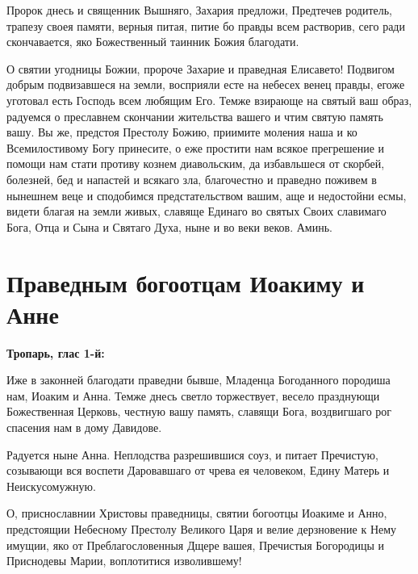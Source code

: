 

Пророк днесь и священник Вышняго, Захария предложи, Предтечев родитель, трапезу своея памяти, верныя питая, питие бо правды всем растворив, сего ради скончавается, яко Божественный таинник Божия благодати.




О святии угодницы Божии, пророче Захарие и праведная Елисавето! Подвигом добрым подвизавшеся на земли, восприяли есте на небесех венец правды, егоже уготовал есть Господь всем любящим Его. Темже взирающе на святый ваш образ, радуемся о преславнем скончании жительства вашего и чтим святую память вашу. Вы же, предстоя Престолу Божию, приимите моления наша и ко Всемилостивому Богу принесите, о еже простити нам всякое прегрешение и помощи нам стати противу кознем диавольским, да избавльшеся от скорбей, болезней, бед и напастей и всякаго зла, благочестно и праведно поживем в нынешнем веце и сподобимся предстательством вашим, аще и недостойни есмы, видети благая на земли живых, славяще Единаго во святых Своих славимаго Бога, Отца и Сына и Святаго Духа, ныне и во веки веков. Аминь.

\newpage\section{Праведным богоотцам Иоакиму и Анне}
 
\bfseries Тропарь, глас 1-й:\normalfont{}


Иже в законней благодати праведни бывше, Младенца Богоданного породиша нам, Иоаким и Анна. Темже днесь светло торжествует, весело празднующи Божественная Церковь, честную вашу память, славящи Бога, воздвигшаго рог спасения нам в дому Давидове.




Радуется ныне Анна. Неплодства разрешившися соуз, и питает Пречистую, созывающи вся воспети Даровавшаго от чрева ея человеком, Едину Матерь и Неискусомужную.




О, приснославнии Христовы праведницы, святии богоотцы Иоакиме и Анно, предстоящии Небесному Престолу Великого Царя и велие дерзновение к Нему имущии, яко от Преблагословенныя Дщере вашея, Пречистыя Богородицы и Приснодевы Марии, воплотитися изволившему!

